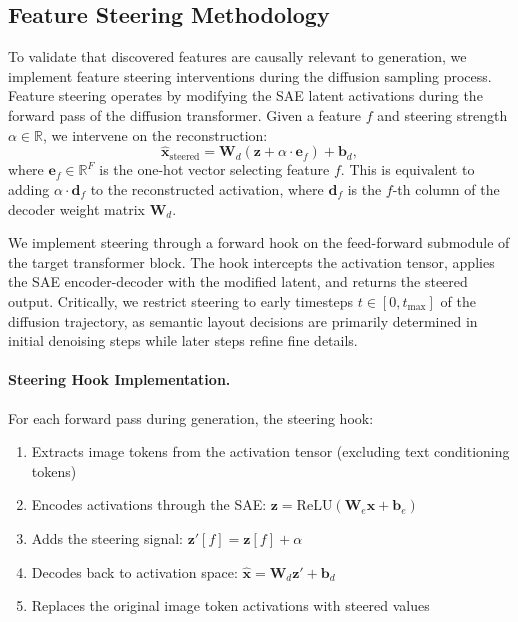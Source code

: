 \documentclass{article}
\begin{document}
\subsection{Feature Steering Methodology}

To validate that discovered features are causally relevant to generation, we implement feature steering interventions during the diffusion sampling process. Feature steering operates by modifying the SAE latent activations during the forward pass of the diffusion transformer. Given a feature $f$ and steering strength $\alpha \in \mathbb{R}$, we intervene on the reconstruction:
\begin{equation}
\hat{\mathbf{x}}_{\text{steered}} = \mathbf{W}_d (\mathbf{z} + \alpha \cdot \mathbf{e}_f) + \mathbf{b}_d,
\end{equation}
where $\mathbf{e}_f \in \mathbb{R}^F$ is the one-hot vector selecting feature $f$. This is equivalent to adding $\alpha \cdot \mathbf{d}_f$ to the reconstructed activation, where $\mathbf{d}_f$ is the $f$-th column of the decoder weight matrix $\mathbf{W}_d$.

We implement steering through a forward hook on the feed-forward submodule of the target transformer block. The hook intercepts the activation tensor, applies the SAE encoder-decoder with the modified latent, and returns the steered output. Critically, we restrict steering to early timesteps $t \in [0, t_{\max}]$ of the diffusion trajectory, as semantic layout decisions are primarily determined in initial denoising steps while later steps refine fine details.

\paragraph{Steering Hook Implementation.}
For each forward pass during generation, the steering hook:
\begin{enumerate}
    \item Extracts image tokens from the activation tensor (excluding text conditioning tokens)
    \item Encodes activations through the SAE: $\mathbf{z} = \mathrm{ReLU}(\mathbf{W}_e \mathbf{x} + \mathbf{b}_e)$
    \item Adds the steering signal: $\mathbf{z}'[f] = \mathbf{z}[f] + \alpha$
    \item Decodes back to activation space: $\hat{\mathbf{x}} = \mathbf{W}_d \mathbf{z}' + \mathbf{b}_d$
    \item Replaces the original image token activations with steered values
\end{enumerate}
\end{document}
